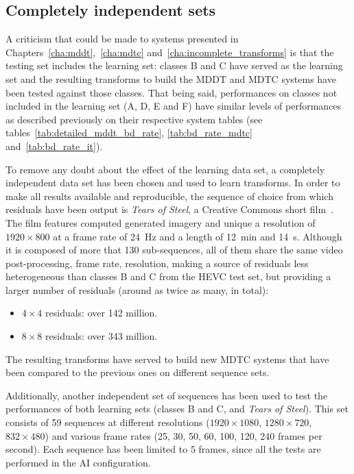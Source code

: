 \documentclass[11pt,a4paper,openright,twoside]{book}
\numberwithin{equation}{section} %
\numberwithin{figure}{section} %
\numberwithin{table}{section} %
\begin{document}
\subsection{Completely independent sets}
\label{sub:rw_completely_independent_sets}

A criticism that could be made to systems presented in
Chapters~\ref{cha:mddt},~\ref{cha:mdtc} and~\ref{cha:incomplete_transforms} is
that the testing set includes the learning set:
classes B and C have served as the learning set and the resulting transforms
to build the \ac{MDDT} and \ac{MDTC} systems have been tested against those
classes.
That being said, performances on classes not included in the learning set (A,
D, E and F) have similar levels of performances as described previously on
their respective system tables (see tables~\ref{tab:detailed_mddt_bd_rate},
\ref{tab:bd_rate_mdtc} and~\ref{tab:bd_rate_it}).

To remove any doubt about the effect of the learning data set, a completely
independent data set has been chosen and used to learn transforms.
In order to make all results available and reproducible, the sequence of
choice from which residuals have been output is \emph{Tears of Steel}, a
Creative Commons short film~\cite{blender-tearsofsteel}.
The film features computed generated imagery and unique a resolution of
$1920\times800$ at a frame rate of \SI{24}{\hertz} and a length of
\SI{12}{\minute} and \SI{14}{\second}.
Although it is composed of more that 130 sub-sequences, all of them share the
same video post-processing, frame rate, resolution, making a source of
residuals less heterogeneous than classes B and C from the \ac{HEVC} test set,
but providing a larger number of residuals (around as twice as many, in
total):
\begin{itemize}
	\item $4\times4$ residuals: over 142 million.
	\item $8\times8$ residuals: over 343 million.
\end{itemize}

The resulting transforms have served to build new \ac{MDTC} systems that have
been compared to the previous ones on different sequence sets.

Additionally, another independent set of sequences has been used to test the
performances of both learning sets (classes B and C, and \emph{Tears of
Steel}).
This set consists of 59 sequences at different resolutions ($1920\times1080$,
$1280\times720$, $832\times480$) and various frame rates (25, 30, 50, 60, 100,
120, 240 frames per second).
Each sequence has been limited to 5 frames, since all the tests are performed
in the \ac{AI} configuration.
\end{document}

